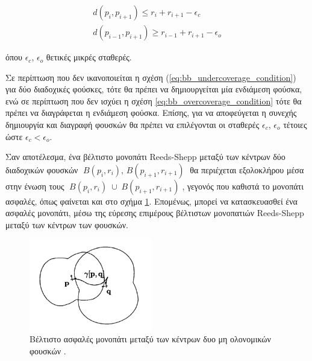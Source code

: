 \begin{align}
	d(p_{i}, p_{i+1}) \leq r_i + r_{i+1} - \epsilon_c
	\label{eq:bb_undercoverage_condition} \\[0.5cm]
	d(p_{i-1}, p_{i+1}) \geq r_{i-1} + r_{i+1} - \epsilon_o
	\label{eq:bb_overcoverage_condition}
\end{align}

\noindent όπου $\epsilon_c$, $\epsilon_o$ θετικές μικρές σταθερές.

\bigskip
Σε περίπτωση που δεν ικανοποιείται η σχέση (\ref{eq:bb_undercoverage_condition}) για δύο διαδοχικές φούσκες, τότε θα πρέπει να δημιουργείται μία ενδιάμεση φούσκα, ενώ σε περίπτωση που δεν ισχύει η σχέση \ref{eq:bb_overcoverage_condition} τότε θα πρέπει να διαγράφεται η ενδιάμεση φούσκα. Επίσης, για να αποφεύγεται η συνεχής δημιουργία και διαγραφή φουσκών θα πρέπει να επιλέγονται οι σταθερές $\epsilon_c$, $\epsilon_o$ τέτοιες ώστε $\epsilon_c < \epsilon_o$.

\bigskip
Σαν αποτέλεσμα, ένα βέλτιστο μονοπάτι Reeds-Shepp μεταξύ των κέντρων δύο διαδοχικών φουσκών $\;B(p_i,r_i)$, $B(p_{i+1},r_{i+1})\;$ θα περιέχεται εξολοκλήρου μέσα στην ένωση τους $\;B(p_i,r_i) \;\cup\; B(p_{i+1},r_{i+1})\;$, γεγονός που καθιστά το μονοπάτι ασφαλές, όπως φαίνεται και στο σχήμα \ref{fig:bubble_band_path}. Επομένως, μπορεί να κατασκευασθεί ένα ασφαλές μονοπάτι, μέσω της εύρεσης επιμέρους βέλτιστων μονοπατιών Reeds-Shepp μεταξύ των κέντρων των φουσκών.

\begin{figure}[!ht]
	\centering
	\includegraphics[height=4cm]{Chapters/Chapter3/Figures/bubble_band_path.png}
	\caption[Βέλτιστο ασφαλές μονοπάτι μεταξύ των κέντρων δυο μη ολονομικών φουσκών.]{Βέλτιστο ασφαλές μονοπάτι μεταξύ των κέντρων δυο μη ολονομικών φουσκών \cite{dpm}.}
	\label{fig:bubble_band_path}
\end{figure}

